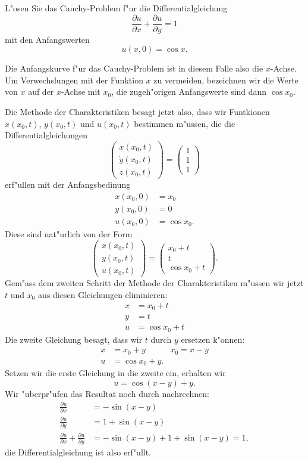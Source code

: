 L"osen Sie das Cauchy-Problem f"ur die Differentialgleichung
\[
\frac{\partial u}{\partial x}
+
\frac{\partial u}{\partial y}
=1
\]
mit den Anfangswerten
\[
u(x,0)=\cos x.
\]

\begin{loesung}
Die Anfangskurve f"ur das Cauchy-Problem ist in diesem Falle also die
$x$-Achse. Um Verwechslungen mit der Funktion $x$ zu vermeiden, bezeichnen
wir die Werte von $x$ auf der $x$-Achse mit $x_0$, die zugeh"origen
Anfangswerte sind dann $\cos x_0$. 

Die Methode der Charakteristiken besagt jetzt also, dass wir Funtkionen
$x(x_0, t)$, $y(x_0,t)$ und $u(x_0,t)$ bestimmen m"ussen, die die
Differentialgleichungen
\[
\begin{pmatrix}
\dot x(x_0,t)\\
\dot y(x_0,t)\\
\dot z(x_0,t)
\end{pmatrix}
=\begin{pmatrix}
1\\1\\1
\end{pmatrix}
\]
erf"ullen mit der Anfangsbedinung
\begin{align*}
x(x_0,0)&=x_0\\
y(x_0,0)&=0\\
u(x_0,0)&=\cos x_0.
\end{align*}
Diese sind nat"urlich von der Form
\[
\begin{pmatrix}
x(x_0,t)\\
y(x_0,t)\\
u(x_0,t)
\end{pmatrix}
=
\begin{pmatrix}
x_0+t\\
t\\
\cos x_0 + t
\end{pmatrix}.
\]
Gem"ass dem zweiten Schritt der Methode der Charakteristiken m"ussen
wir jetzt $t$ und $x_0$ aus diesen Gleichungen eliminieren:
\begin{align*}
x&=x_0+t\\
y&=t\\
u&=\cos x_0 + t
\end{align*}
Die zweite Gleichung besagt, dass wir $t$ durch $y$ ersetzen k"onnen:
\begin{align*}
x&=x_0+y&x_0=x-y\\
u&=\cos x_0 + y.
\end{align*}
Setzen wir die erste Gleichung in die zweite ein, erhalten wir
\[
u=\cos(x-y)+y.
\]
Wir "uberpr"ufen das Resultat noch durch nachrechnen:
\begin{align*}
\frac{\partial u}{\partial x}
&=
-\sin(x-y)
\\
\frac{\partial u}{\partial y}
&=
1+\sin(x-y)
\\
\frac{\partial u}{\partial x}
+
\frac{\partial u}{\partial y}
&=
-\sin(x-y)
+
1+\sin(x-y)
=1,
\end{align*}
die Differentialgleichung ist also erf"ullt.
\end{loesung}

